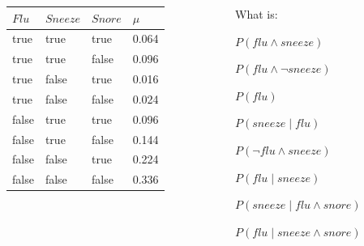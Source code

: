 \documentclass[12pt]{beamer} %
\begin{document}
\begin{slide}
\begin{columns}
\begin{column}{6cm}
\begin{tabular}{|lll|l|}\hline
$Flu$ &  $Sneeze$ & $Snore$ & $\mu$\\
\hline
true & true & true & 0.064 \\
true & true & false & 0.096 \\
true & false & true & 0.016\\
true & false & false & 0.024 \\
false & true & true & 0.096 \\
false & true & false & 0.144 \\
false & false & true & 0.224 \\
false & false & false & 0.336 \\\hline
\end{tabular}
\end{column}

\begin{column}{6cm}
What is:
\begin{enumeratea}
\item $P(flu \land sneeze)$ %
\item $P(flu \land \neg sneeze)$ %
\item $P(flu)$ %
\item $P(sneeze\mid flu)$ %
\item $P(\neg flu  \land sneeze)$ %
\item $P(flu \mid sneeze)$ %
\item $P(sneeze\mid flu \land snore)$ %
\item $P(flu\mid sneeze \land snore)$ %
\end{enumeratea}
\end{column}
\end{columns}
\end{slide}
\end{document}
